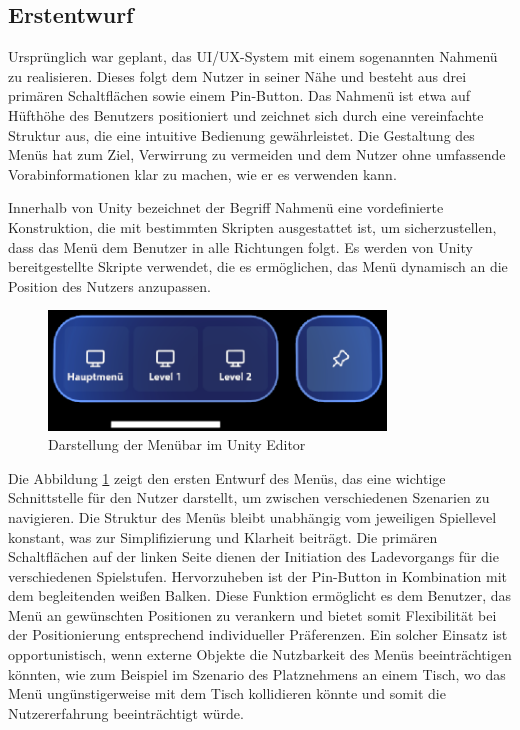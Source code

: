 \subsection{Erstentwurf}
Ursprünglich war geplant, das UI/UX-System mit einem sogenannten Nahmenü zu realisieren. Dieses folgt dem Nutzer in
seiner Nähe und besteht aus drei primären Schaltflächen sowie einem Pin-Button. Das Nahmenü ist etwa auf Hüfthöhe des
Benutzers positioniert und zeichnet sich durch eine vereinfachte Struktur aus, die eine intuitive Bedienung gewährleistet.
Die Gestaltung des Menüs hat zum Ziel, Verwirrung zu vermeiden und dem Nutzer ohne umfassende Vorabinformationen klar zu
machen, wie er es verwenden kann.

Innerhalb von Unity bezeichnet der Begriff Nahmenü eine
vordefinierte Konstruktion, die mit bestimmten Skripten ausgestattet ist, um sicherzustellen, dass das Menü dem Benutzer
in alle Richtungen folgt. Es werden von Unity bereitgestellte Skripte verwendet, die es ermöglichen, das Menü dynamisch
an die Position des Nutzers anzupassen.

\begin{figure}[H]
    \centering
    \includegraphics[width=0.8\textwidth]{images/menubarversion1.png}
    \caption{Darstellung der Menübar im Unity Editor}
    \label{fig:menübar}
\end{figure}

Die Abbildung \ref{fig:menübar} zeigt den ersten Entwurf des Menüs, das eine wichtige Schnittstelle für den Nutzer
darstellt, um zwischen verschiedenen Szenarien zu navigieren. Die Struktur des Menüs bleibt unabhängig vom jeweiligen
Spiellevel konstant, was zur Simplifizierung und Klarheit beiträgt. Die primären Schaltflächen auf der linken Seite dienen
der Initiation des Ladevorgangs für die verschiedenen Spielstufen. Hervorzuheben ist der Pin-Button in Kombination mit
dem begleitenden weißen Balken. Diese Funktion ermöglicht es dem Benutzer, das Menü an gewünschten Positionen zu verankern
und bietet somit Flexibilität bei der Positionierung entsprechend individueller Präferenzen. Ein solcher Einsatz ist
opportunistisch, wenn externe Objekte die Nutzbarkeit des Menüs beeinträchtigen könnten, wie zum Beispiel im Szenario
des Platznehmens an einem Tisch, wo das Menü ungünstigerweise mit dem Tisch kollidieren könnte und somit die Nutzererfahrung
beeinträchtigt würde.

